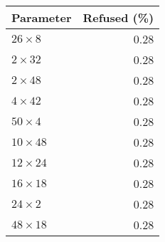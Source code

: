 \begin{tabular}{lr}
\toprule
      Parameter &  Refused (\%) \\
\midrule
  $26 \times 8$ &          0.28 \\
  $2 \times 32$ &          0.28 \\
  $2 \times 48$ &          0.28 \\
  $4 \times 42$ &          0.28 \\
  $50 \times 4$ &          0.28 \\
 $10 \times 48$ &          0.28 \\
 $12 \times 24$ &          0.28 \\
 $16 \times 18$ &          0.28 \\
  $24 \times 2$ &          0.28 \\
 $48 \times 18$ &          0.28 \\
\bottomrule
\end{tabular}

